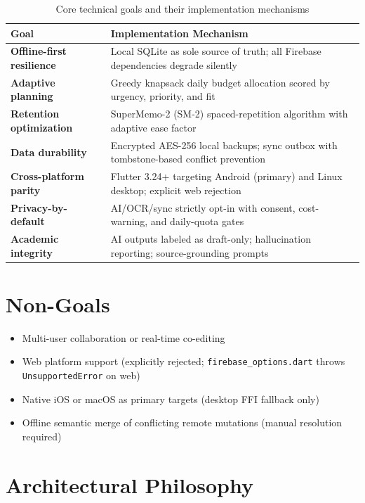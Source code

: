 \documentclass[12pt,a4paper,openany]{report}
\begin{document}
\begin{table}[H]
\centering
\caption{Core technical goals and their implementation mechanisms}
\label{tab:core-goals}
\begin{tabular}{>{\bfseries}l p{10cm}}
\toprule
\textbf{Goal} & \textbf{Implementation Mechanism} \\
\midrule
Offline-first resilience & Local SQLite as sole source of truth; all Firebase dependencies degrade silently \\
Adaptive planning & Greedy knapsack daily budget allocation scored by urgency, priority, and fit \\
Retention optimization & SuperMemo-2 (SM-2) spaced-repetition algorithm with adaptive ease factor \\
Data durability & Encrypted AES-256 local backups; sync outbox with tombstone-based conflict prevention \\
Cross-platform parity & Flutter 3.24+ targeting Android (primary) and Linux desktop; explicit web rejection \\
Privacy-by-default & AI/OCR/sync strictly opt-in with consent, cost-warning, and daily-quota gates \\
Academic integrity & AI outputs labeled as draft-only; hallucination reporting; source-grounding prompts \\
\bottomrule
\end{tabular}
\end{table}

\section{Non-Goals}

\begin{itemize}[leftmargin=*]
  \item Multi-user collaboration or real-time co-editing
  \item Web platform support (explicitly rejected; \texttt{firebase\_options.dart} throws \texttt{UnsupportedError} on web)
  \item Native iOS or macOS as primary targets (desktop FFI fallback only)
  \item Offline semantic merge of conflicting remote mutations (manual resolution required)
\end{itemize}

\section{Architectural Philosophy}
\end{document}
